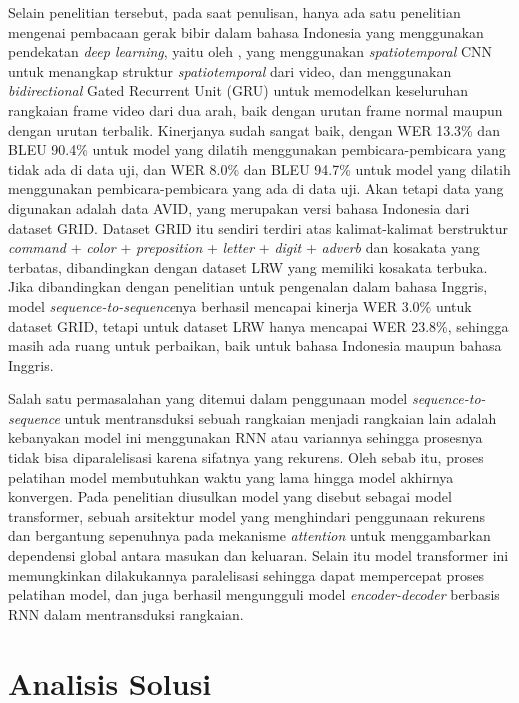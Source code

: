 Selain penelitian tersebut, pada saat penulisan, hanya ada satu penelitian mengenai pembacaan gerak bibir dalam bahasa Indonesia yang menggunakan pendekatan \textit{deep learning}, yaitu oleh \textcite{Maulana2017}, yang menggunakan \textit{spatiotemporal} CNN untuk menangkap struktur \textit{spatiotemporal} dari video, dan menggunakan \textit{bidirectional} Gated Recurrent Unit (GRU) untuk memodelkan keseluruhan rangkaian frame video dari dua arah, baik dengan urutan frame normal maupun dengan urutan terbalik. Kinerjanya sudah sangat baik, dengan WER 13.3\% dan BLEU 90.4\% untuk model yang dilatih menggunakan pembicara-pembicara yang tidak ada di data uji, dan WER 8.0\% dan BLEU 94.7\% untuk model yang dilatih menggunakan pembicara-pembicara yang ada di data uji. Akan tetapi data yang digunakan adalah data AVID, yang merupakan versi bahasa Indonesia dari dataset GRID. Dataset GRID itu sendiri terdiri atas kalimat-kalimat berstruktur \textit{command} + \textit{color} + \textit{preposition} + \textit{letter} + \textit{digit} + \textit{adverb} dan kosakata yang terbatas, dibandingkan dengan dataset LRW yang memiliki kosakata terbuka. Jika dibandingkan dengan penelitian \textcite{Chung2016} untuk pengenalan dalam bahasa Inggris, model \textit{sequence-to-sequence}nya berhasil mencapai kinerja WER 3.0\% untuk dataset GRID, tetapi untuk dataset LRW hanya mencapai WER 23.8\%, sehingga masih ada ruang untuk perbaikan, baik untuk bahasa Indonesia maupun bahasa Inggris.
\bigskip

Salah satu permasalahan yang ditemui dalam penggunaan model \textit{sequence-to-sequence} untuk mentransduksi sebuah rangkaian menjadi rangkaian lain adalah kebanyakan model ini menggunakan RNN atau variannya sehingga prosesnya tidak bisa diparalelisasi karena sifatnya yang rekurens. Oleh sebab itu, proses pelatihan model membutuhkan waktu yang lama hingga model akhirnya konvergen. Pada penelitian \textcite{Vaswani2017} diusulkan model yang disebut sebagai model transformer, sebuah arsitektur model yang menghindari penggunaan rekurens dan bergantung sepenuhnya pada mekanisme \textit{attention} untuk menggambarkan dependensi global antara masukan dan keluaran. Selain itu model transformer ini memungkinkan dilakukannya paralelisasi sehingga dapat mempercepat proses pelatihan model, dan juga berhasil mengungguli model \textit{encoder-decoder} berbasis RNN dalam mentransduksi rangkaian.


\section{Analisis Solusi}

